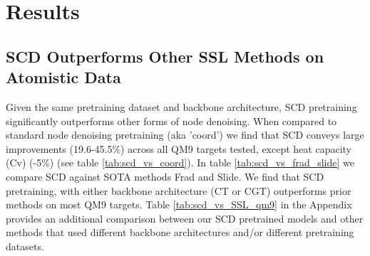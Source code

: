 \documentclass{article}
\theoremstyle{plain}
\theoremstyle{definition}
\theoremstyle{remark}
\begin{document}


\section{Results}
\label{results}

\subsection{SCD Outperforms Other SSL Methods on Atomistic Data}
Given the same pretraining dataset and backbone architecture, SCD pretraining significantly outperforms other forms of node denoising. When compared to standard node denoising pretraining (aka 'coord') we find that SCD conveys large improvements (19.6-45.5\%) across all QM9 targets tested, except heat capacity (Cv) (-5\%) (see table \ref{tab:scd_vs_coord}). In table \ref{tab:scd_vs_frad_slide} we compare SCD against SOTA methods Frad and Slide. We find that SCD pretraining, with either backbone architecture (CT or CGT) outperforms prior methods on most QM9 targets. Table \ref{tab:scd_vs_SSL_qm9} in the Appendix provides an additional comparison between our SCD pretrained models and other methods that used different backbone architectures and/or different pretraining datasets.



\end{document}

